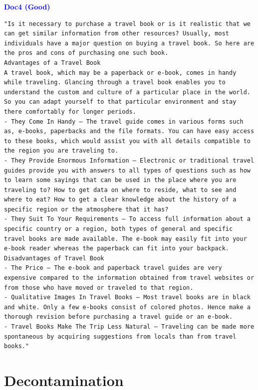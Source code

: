 \documentclass{article}
\begin{document}
\textcolor{blue}{\textbf{Doc4 (Good)}}
\begin{scriptsize}
\begin{Verbatim}[frame=single, framesep=3mm, breaklines=true]
"Is it necessary to purchase a travel book or is it realistic that we can get similar information from other resources? Usually, most individuals have a major question on buying a travel book. So here are the pros and cons of purchasing one such book.
Advantages of a Travel Book
A travel book, which may be a paperback or e-book, comes in handy while traveling. Glancing through a travel book enables you to understand the custom and culture of a particular place in the world. So you can adapt yourself to that particular environment and stay there comfortably for longer periods.
- They Come In Handy — The travel guide comes in various forms such as, e-books, paperbacks and the file formats. You can have easy access to these books, which would assist you with all details compatible to the region you are traveling to.
- They Provide Enormous Information — Electronic or traditional travel guides provide you with answers to all types of questions such as how to learn some sayings that can be used in the place where you are traveling to? How to get data on where to reside, what to see and where to eat? How to get a clear knowledge about the history of a specific region or the atmosphere that it has?
- They Suit To Your Requirements — To access full information about a specific country or a region, both types of general and specific travel books are made available. The e-book may easily fit into your e-book reader whereas the paperback can fit into your backpack.
Disadvantages of Travel Book
- The Price — The e-book and paperback travel guides are very expensive compared to the information obtained from travel websites or from those who have moved or traveled to that region.
- Qualitative Images In Travel Books — Most travel books are in black and white. Only a few e-books consist of colored photos. Hence make a thorough revision before purchasing a travel guide or an e-book.
- Travel Books Make The Trip Less Natural — Traveling can be made more spontaneous by acquiring suggestions from locals than from travel books."
\end{Verbatim}
\end{scriptsize}

\section{Decontamination}\label{appx:decontamination}
\end{document}
